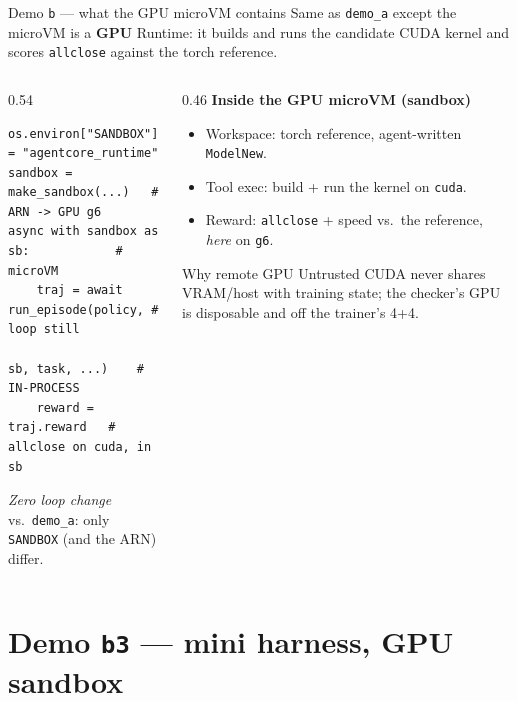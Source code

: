 \documentclass[aspectratio=169]{beamer}
\begin{document}
\begin{frame}[fragile]{Demo \texttt{b} --- what the GPU microVM contains}
  \footnotesize Same as \texttt{demo\_a} except the microVM is a \textbf{GPU} Runtime: it builds and runs
  the candidate CUDA kernel and scores \texttt{allclose} against the torch reference.
  \begin{columns}[T]
    \begin{column}{0.54\textwidth}
{\scriptsize
\begin{verbatim}
os.environ["SANDBOX"] = "agentcore_runtime"
sandbox = make_sandbox(...)   # ARN -> GPU g6
async with sandbox as sb:            # microVM
    traj = await run_episode(policy, # loop still
                   sb, task, ...)    # IN-PROCESS
    reward = traj.reward   # allclose on cuda, in sb
\end{verbatim}}
      \scriptsize \emph{Zero loop change} vs.\ \texttt{demo\_a}: only \texttt{SANDBOX} (and the ARN) differ.
    \end{column}
    \begin{column}{0.46\textwidth}
      \footnotesize\textbf{Inside the GPU microVM (sandbox)}
      \begin{itemize}\setlength\itemsep{0.08em}
        \item Workspace: torch reference, agent-written \texttt{ModelNew}.
        \item Tool exec: build + run the kernel on \texttt{cuda}.
        \item Reward: \texttt{allclose} + speed vs.\ the reference, \emph{here} on \texttt{g6}.
      \end{itemize}
      \begin{block}{Why remote GPU}
        \scriptsize Untrusted CUDA never shares VRAM/host with training state; the checker's GPU is
        disposable and off the trainer's 4+4.
      \end{block}
    \end{column}
  \end{columns}
\end{frame}

\section{Demo \texttt{b3} --- mini harness, GPU sandbox}
\end{document}
